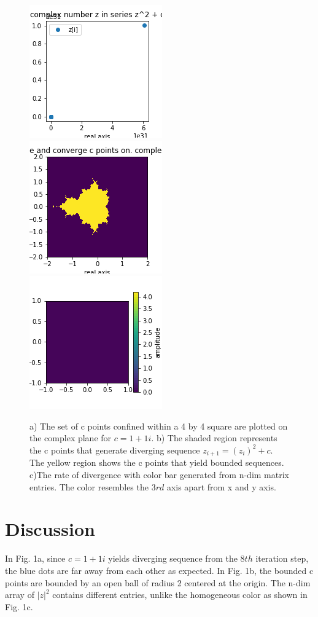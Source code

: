 \documentclass{article}
\begin{document}
\begin{figure}[H]
    \centering
    \includegraphics[scale=0.7]{diverge(1,1).png}
    \includegraphics[scale=0.7]{2colours.png}
    \includegraphics[scale=0.5]{colorbar.png}
    \caption{a) The set of c points confined within a 4 by 4 square are plotted on the complex plane for $c = 1 + 1i$. b) The shaded region represents the c points that generate diverging sequence \(z_{i+1}=(z_i)^2 + c\). The yellow region shows the c points that yield bounded sequences. c)The rate of divergence with color bar generated from n-dim matrix entries. The color resembles the $3rd$ axis apart from x and y axis. }
    \label{fig:Q1}
\end{figure}

\section{Discussion}
In Fig. 1a, since $c = 1 + 1i$ yields diverging sequence from the $8th$ iteration step, the blue dots are far away from each other as expected. In Fig. 1b, the bounded c points are bounded by an open ball of radius 2 centered at the origin. The n-dim array of \(|z|^2\) contains different entries, unlike the homogeneous color as shown in Fig. 1c.
\end{document}
